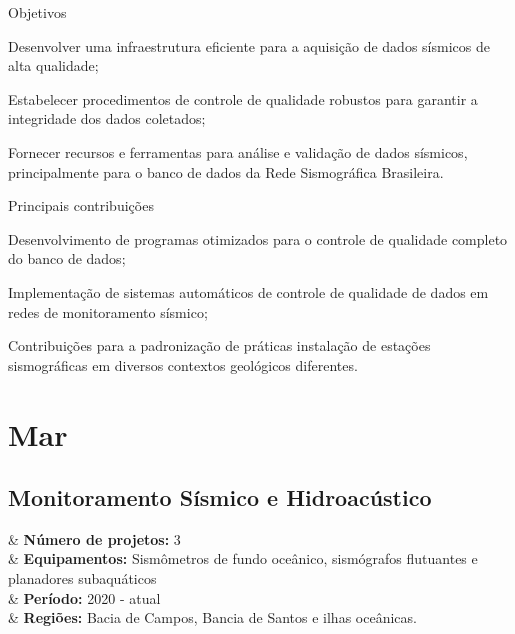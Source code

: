 \documentclass[10pt,a4paper,oneside]{book}
\begin{document}
\begin{fancyenum}{\faFutbol}{Objetivos}
  \item Desenvolver uma infraestrutura eficiente para a aquisição de dados sísmicos de alta qualidade;
  \item Estabelecer procedimentos de controle de qualidade robustos para garantir a integridade dos dados coletados;
  \item Fornecer recursos e ferramentas para análise e validação de dados sísmicos, principalmente para o banco de dados da Rede Sismográfica Brasileira.
\end{fancyenum}

\begin{fancyenum}{\faCogs}{Principais contribuições}
  \item Desenvolvimento de programas otimizados para o controle de qualidade completo do banco de dados;
  \item Implementação de sistemas automáticos de controle de qualidade de dados em redes de monitoramento sísmico;
  \item Contribuições para a padronização de práticas instalação de estações sismográficas em diversos contextos geológicos diferentes.
\end{fancyenum}

\chapter{Mar}
\label{cap_mar}

\section{Monitoramento Sísmico e Hidroacústico}


\begin{summarybox}[frametitle=\faProjectDiagram{}\quad Panorama da linha de pesquisa]
	\begin{datelist}
		\faFile* & \textbf{Número de projetos:} 3 \\
		\faBinoculars & \textbf{Equipamentos:} Sismômetros de fundo oceânico, sismógrafos flutuantes e planadores subaquáticos \\
		\faCalendar*[regular] & \textbf{Período:} 2020 - atual \\
		\faMapMarked* & \textbf{Regiões:} Bacia de Campos, Bancia de Santos e ilhas oceânicas. \\
	\end{datelist}
\end{summarybox}
\end{document}
